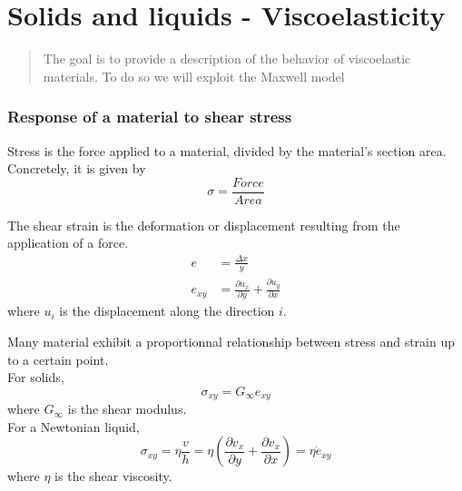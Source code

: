\documentclass[../phys-f308.tex]{subfiles}
\begin{document}
    \part{Solids and liquids - Viscoelasticity}

    \begin{abstract}
        The goal is to provide a description of the behavior of viscoelastic materials. To do so we will exploit the Maxwell model
    \end{abstract}


    \section{Response of a material to shear stress}

    \begin{definition}
        Stress is the force applied to a material, divided by the material's section area. Concretely, it is given by
        \begin{equation}
            \sigma = \frac{Force}{Area}
        \end{equation}
    \end{definition}

    \begin{definition}
        The shear strain is the deformation or displacement resulting from the application of a force.
        \begin{align}
            e &= \frac{\Delta x}{y}\\
            e_{xy} &= \frac{\partial u_x}{\partial y}+\frac{\partial u_y}{\partial x}
        \end{align}
        where $u_i$ is the displacement along the direction $i$.
    \end{definition}

    \begin{property}
        Many material exhibit a proportionnal relationship between stress and strain up to a certain point.\\
        
        For solids,
        \begin{equation}
            \sigma_{xy} = G_\infty e_{xy}
        \end{equation}
        where $G_\infty$ is the shear modulus.\\

        For a Newtonian liquid,
        \begin{equation}
            \sigma_{xy} = \eta\frac{v}{h} = \eta\left(\frac{\partial v_x}{\partial y}+\frac{\partial v_x}{\partial x}\right) = \eta\dot{e}_{xy}
        \end{equation}
        where $\eta$ is the shear viscosity.
    \end{property}
\end{document}
